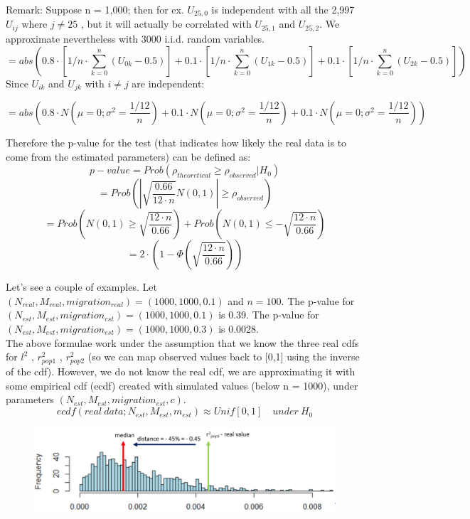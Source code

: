 \documentclass[a4paper,12pt]{article}
\begin{document}
{\noindent Remark: Suppose n = 1,000; then for ex. $U_{25,0}$ is independent with all the 2,997 $U_{ij}$ where $j \neq  25$ , but it will actually be correlated with $U_{25,1}$ and $U_{25,2}$. We approximate nevertheless with 3000 i.i.d. random variables.
$$ = abs( 0.8\cdot [1/n \cdot \sum_{k= 0}^{n} (U_{0k} - 0.5)]
+ 0.1 \cdot [1/n \cdot\sum_{k= 0}^{n} (U_{1k} - 0.5)] + 0.1 \cdot [1/n \cdot\sum_{k= 0}^{n} (U_{2k} - 0.5)] )$$ 
Since $U_{ik}$ and $U_{jk}$ with $i \neq j$ are independent:

$$ = abs( 0.8\cdot N(\mu = 0; \sigma^2 = \frac{1/12}{n}) + 0.1 \cdot N(\mu = 0; \sigma^2 = \frac{1/12}{n}) + 0.1 \cdot N(\mu = 0; \sigma^2 = \frac{1/12}{n}) )$$

Therefore the p-value for the test (that indicates how likely the real data is to come from the estimated parameters) can be defined as:\\
$$p-value = Prob(\rho_{theoretical} \ge \rho_{observed} | H_{0})$$
$$ = Prob(|\sqrt{\frac{0.66}{12 \cdot n}} N(0,1) | \ge \rho_{observed})$$
$$= Prob(N(0,1) \ge \sqrt{\frac{12 \cdot n}{0.66}}) + Prob(N(0,1) \le - \sqrt{\frac{12 \cdot n}{0.66}}) $$
$$= 2 \cdot(1- \Phi( \sqrt{\frac{12 \cdot n}{0.66}}))$$

\pagebreak

Let's see a couple of examples. Let $(N_{real}, M_{real}, migration_{real}) = (1000, 1000, 0.1)$ and $n = 100$.
The p-value for $(N_{est}, M_{est}, migration_{est}) = (1000, 1000, 0.1)$ is 0.39.
The p-value for $(N_{est}, M_{est}, migration_{est}) = (1000, 1000, 0.3)$ is 0.0028.\\

\noindent The above formulae work under the assumption that we know the three real cdfs for  $l^2$ , $r^2_{pop1}$ , $r^2_{pop2}$ (so we can map observed values back to [0,1] using the inverse of the cdf). However, we do not know the real cdf, we are approximating it with some empirical cdf (ecdf) created with simulated values (below n = 1000), under parameters $(N_{est}, M_{est}, migration_{est}, c)$.
$$ ecdf(real \: data; N_{est}, M_{est}, m_{est}) \approx Unif[0,1] \quad under \: H_0$$
\begin{figure}[H]    
    \includegraphics[scale=0.6]{15.png}%
\end{figure}%

}
\end{document}
